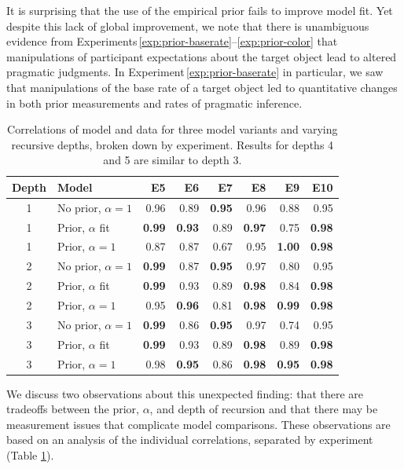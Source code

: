 \documentclass[man,noapacite]{apa2}
\newcounter{Experiment}
\newcommand{\exptref}[1]{Experiment\,\ref{#1}}
\newcommand{\exptrefrange}[2]{Experiments\,\ref{#1}--\ref{#2}}
\begin{document}
It is surprising that the use of the empirical prior fails to improve model fit. Yet despite this lack of global improvement, we note that there is unambiguous evidence from \exptrefrange{exp:prior-baserate}{exp:prior-color} that manipulations of participant expectations about the target object lead to altered pragmatic judgments. In \exptref{exp:prior-baserate} in particular, we saw that manipulations of the base rate of a target object led to quantitative changes in both prior measurements and rates of pragmatic inference.

\begin{table}[ht]
\centering
\begin{tabular}{clrrrrrr}
  \hline
Depth & Model & E5 & E6 & E7 & E8 & E9 & E10 \\
  \hline
  1 & No prior, $\alpha=1$ & 0.96 & 0.89 & {\bf 0.95} & 0.96 & 0.88 & 0.95 \\
    1 & Prior, $\alpha$ fit & {\bf 0.99} & {\bf 0.93} & 0.89 & {\bf 0.97} & 0.75 & {\bf 0.98} \\
    1 & Prior, $\alpha=1$ & 0.87 & 0.87 & 0.67 & 0.95 & {\bf 1.00} & {\bf 0.98} \\
  \hline
    2 & No prior, $\alpha=1$ & {\bf 0.99} & 0.87 & {\bf 0.95} & 0.97 & 0.80 & 0.95 \\
    2 & Prior, $\alpha$ fit & {\bf 0.99} & 0.93 & 0.89 & {\bf 0.98} & 0.84 & {\bf 0.98} \\
    2 & Prior, $\alpha=1$ & 0.95 & {\bf 0.96} & 0.81 & {\bf 0.98} & {\bf 0.99} & {\bf 0.98} \\
  \hline
    3 & No prior, $\alpha=1$ & {\bf 0.99} & 0.86 & {\bf 0.95} & 0.97 & 0.74 & 0.95 \\
    3 & Prior, $\alpha$ fit & {\bf 0.99} & 0.93 & 0.89 & {\bf 0.98} & 0.89 & {\bf 0.98} \\
    3 & Prior, $\alpha=1$ & 0.98 & {\bf 0.95} & 0.86 & {\bf 0.98} & {\bf 0.95} & {\bf 0.98} \\
  \hline
\end{tabular}
\caption{\label{tab:expts-corrs} Correlations of model and data for three model variants and varying recursive depths, broken down by experiment. Results for depths 4 and 5 are similar to depth 3.}
\end{table}

We discuss two observations about this unexpected finding: that there are tradeoffs between the prior, $\alpha$, and depth of recursion and that there may be measurement issues that complicate model comparisons. These observations are based on an analysis of the individual correlations, separated by experiment (Table \ref{tab:expts-corrs}).
\end{document}
